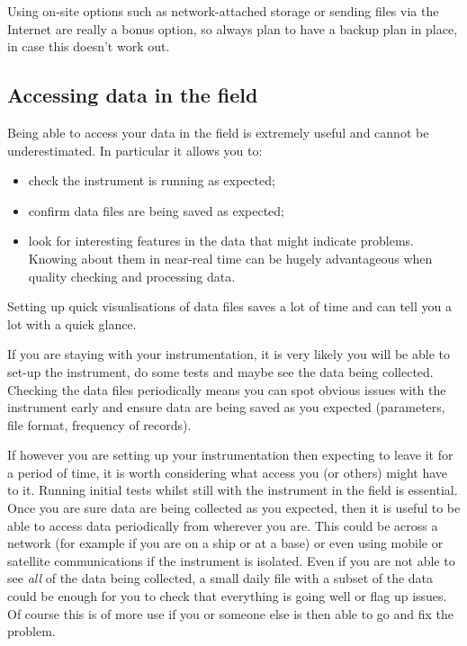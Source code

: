 \documentclass[a4paper,oneside]{report}
\providecommand{\tightlist}{%
  \setlength{\itemsep}{0pt}\setlength{\parskip}{0pt}}
\begin{document}
Using on-site options such as network-attached storage or sending files
via the Internet are really a bonus option, so always plan to have a
backup plan in place, in case this doesn't work out.

\hypertarget{accessing-data-in-the-field}{%
\subsection{Accessing data in the
field}\label{accessing-data-in-the-field}}

Being able to access your data in the field is extremely useful and
cannot be underestimated. In particular it allows you to:

\begin{itemize}
\tightlist
\item
  check the instrument is running as expected;
\item
  confirm data files are being saved as expected;
\item
  look for interesting features in the data that might indicate
  problems. Knowing about them in near-real time can be hugely
  advantageous when quality checking and processing data.
\end{itemize}

Setting up quick visualisations of data files saves a lot of time and
can tell you a lot with a quick glance.

If you are staying with your instrumentation, it is very likely you will
be able to set-up the instrument, do some tests and maybe see the data
being collected. Checking the data files periodically means you can spot
obvious issues with the instrument early and ensure data are being saved
as you expected (parameters, file format, frequency of records).

If however you are setting up your instrumentation then expecting to
leave it for a period of time, it is worth considering what access you
(or others) might have to it. Running initial tests whilst still with
the instrument in the field is essential. Once you are sure data are
being collected as you expected, then it is useful to be able to access
data periodically from wherever you are. This could be across a network
(for example if you are on a ship or at a base) or even using mobile or
satellite communications if the instrument is isolated. Even if you are
not able to see \emph{all} of the data being collected, a small daily
file with a subset of the data could be enough for you to check that
everything is going well or flag up issues. Of course this is of more
use if you or someone else is then able to go and fix the problem.
\end{document}
